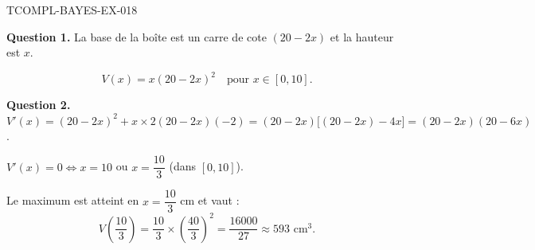 \begin{corrige}{TCOMPL-BAYES-EX-018}

\textbf{Question 1.} La base de la boîte est un carre de cote $(20 - 2x)$ et la hauteur est $x$.


\[ V(x) = x(20 - 2x)^2 \quad \text{pour } x \in [0, 10]. \]

\textbf{Question 2.} $V'(x) = (20-2x)^2 + x \times 2(20-2x)(-2) = (20-2x)\bigl[(20-2x) - 4x\bigr] = (20-2x)(20-6x)$.

$V'(x) = 0 \iff x = 10$ ou $x = \dfrac{10}{3}$ (dans $[0,10]$).

Le maximum est atteint en $x = \dfrac{10}{3}$ cm et vaut :
\[ V\!\left(\dfrac{10}{3}\right) = \dfrac{10}{3} \times \left(\dfrac{40}{3}\right)^2 = \dfrac{16000}{27} \approx 593 \text{ cm}^3. \]

\end{corrige}
